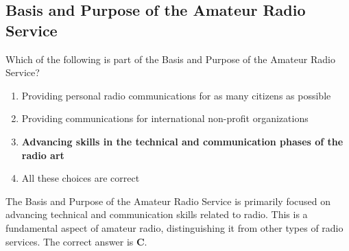 \subsection{Basis and Purpose of the Amateur Radio Service}
\label{T1A01}

\begin{tcolorbox}[colback=gray!10!white,colframe=black!75!black,title=T1A01]
Which of the following is part of the Basis and Purpose of the Amateur Radio Service?
\begin{enumerate}[label=\Alph*),noitemsep]
    \item Providing personal radio communications for as many citizens as possible
    \item Providing communications for international non-profit organizations
    \item \textbf{Advancing skills in the technical and communication phases of the radio art}
    \item All these choices are correct
\end{enumerate}
\end{tcolorbox}

The Basis and Purpose of the Amateur Radio Service is primarily focused on advancing technical and communication skills related to radio. This is a fundamental aspect of amateur radio, distinguishing it from other types of radio services. The correct answer is \textbf{C}.